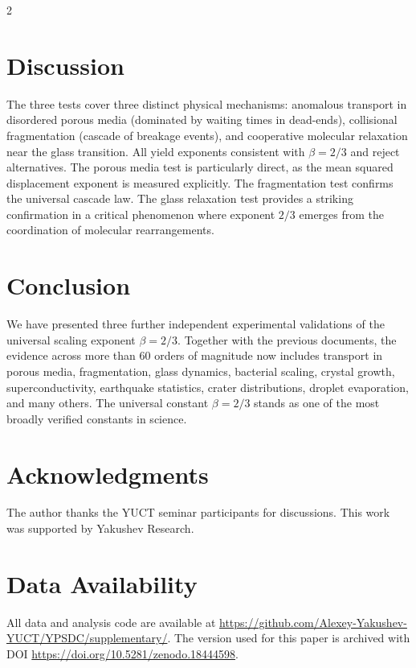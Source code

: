 \documentclass[11pt,a4paper]{article}
\newcommand{\betaf}{\beta}
\begin{document}
\begin{multicols}{2}
		\section{Discussion}
		
		The three tests cover three distinct physical mechanisms: anomalous transport in disordered porous media (dominated by waiting times in dead-ends), collisional fragmentation (cascade of breakage events), and cooperative molecular relaxation near the glass transition. All yield exponents consistent with \(\betaf = 2/3\) and reject alternatives. The porous media test is particularly direct, as the mean squared displacement exponent is measured explicitly. The fragmentation test confirms the universal cascade law. The glass relaxation test provides a striking confirmation in a critical phenomenon where exponent \(2/3\) emerges from the coordination of molecular rearrangements.
		
		\section{Conclusion}
		
		We have presented three further independent experimental validations of the universal scaling exponent \(\betaf = 2/3\). Together with the previous documents, the evidence across more than 60 orders of magnitude now includes transport in porous media, fragmentation, glass dynamics, bacterial scaling, crystal growth, superconductivity, earthquake statistics, crater distributions, droplet evaporation, and many others. The universal constant \(\betaf = 2/3\) stands as one of the most broadly verified constants in science.
		
		\section*{Acknowledgments}
		
		The author thanks the YUCT seminar participants for discussions. This work was supported by Yakushev Research.
		
		\section*{Data Availability}
		All data and analysis code are available at \url{https://github.com/Alexey-Yakushev-YUCT/YPSDC/supplementary/}. The version used for this paper is archived with DOI \url{https://doi.org/10.5281/zenodo.18444598}.
		

\end{multicols}
\end{document}
